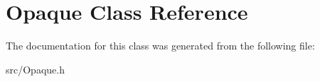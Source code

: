 \hypertarget{class_opaque}{}\section{Opaque Class Reference}
\label{class_opaque}


The documentation for this class was generated from the following file\+:\begin{DoxyCompactItemize}
\item 
src/Opaque.\+h\end{DoxyCompactItemize}

